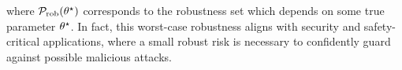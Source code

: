 where $\mathcal{P}_{\text{rob}}(\theta^{\star})$ corresponds to the robustness set which depends on 
some true parameter $\theta^{\star}$.
In fact, this worst-case robustness aligns with security and safety-critical applications, where a small robust risk is necessary to confidently guard against possible malicious attacks.


\par

